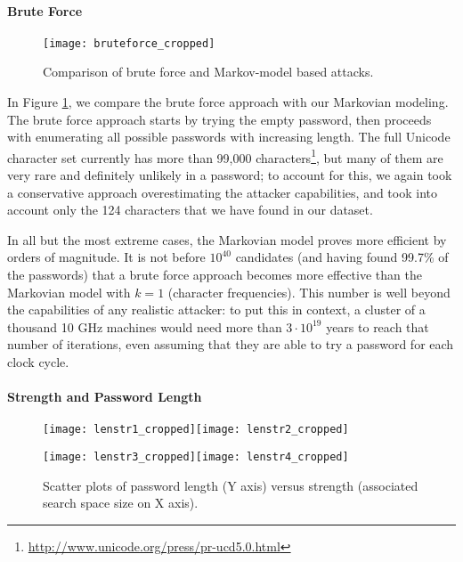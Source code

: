 \documentclass[a4paper,twocolumn]{article}
\begin{document}
\paragraph{Brute Force}

\begin{figure}
\begin{centering}
\texttt{[image: bruteforce\_cropped]}
\par\end{centering}

\caption{\label{fig:Brute-force.}Comparison of brute force and Markov-model
based attacks.}

\end{figure}


In Figure \ref{fig:Brute-force.}, we compare the brute force approach
with our Markovian modeling. The brute force approach starts by trying
the empty password, then proceeds with enumerating all possible passwords
with increasing length. The full Unicode character set currently has
more than 99,000 characters\footnote{\url{http://www.unicode.org/press/pr-ucd5.0.html}}, but many of them are very rare and definitely unlikely in a password;
to account for this, we again took a conservative approach overestimating
the attacker capabilities, and took into account only the 124 characters
that we have found in our dataset.

In all but the most extreme cases, the Markovian model proves more
efficient by orders of magnitude. It is not before $10^{40}$ candidates
(and having found 99.7\% of the passwords) that a brute force approach
becomes more effective than the Markovian model with $k=1$ (character
frequencies). This number is well beyond the capabilities of any realistic
attacker: to put this in context, a cluster of a thousand 10 GHz machines
would need more than $3\cdot10^{19}$ years to reach that number of
iterations, even assuming that they are able to try a password for
each clock cycle.


\paragraph{Strength and Password Length}

\begin{figure}
\begin{centering}
\texttt{[image: lenstr1\_cropped]}\texttt{[image: lenstr2\_cropped]}
\par\end{centering}

\begin{centering}
\texttt{[image: lenstr3\_cropped]}\texttt{[image: lenstr4\_cropped]}
\par\end{centering}

\caption{\label{fig:Password-length-vs.}Scatter plots of password length (Y
axis) versus strength (associated search space size on X axis).}

\end{figure}
\end{document}
